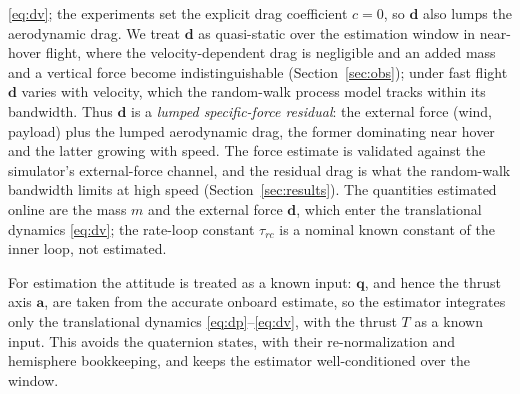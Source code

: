 \documentclass[lettersize,journal]{IEEEtran}
\newcommand{\vect}[1]{\bm{#1}}
\begin{document}
\eqref{eq:dv}; the experiments set the explicit drag coefficient $c=0$, so $\vect{d}$
also lumps the aerodynamic drag. We treat $\vect{d}$ as quasi-static over the
estimation window in near-hover flight, where the velocity-dependent drag is
negligible and an added mass and a vertical force become indistinguishable
(Section~\ref{sec:obs}); under fast flight $\vect{d}$ varies with velocity, which
the random-walk process model tracks within its bandwidth. Thus $\vect{d}$ is a
\emph{lumped specific-force residual}: the external force (wind, payload) plus the
lumped aerodynamic drag, the former dominating near hover and the latter growing
with speed. The force estimate is validated against the simulator's external-force
channel, and the residual drag is what the random-walk bandwidth limits at high
speed (Section~\ref{sec:results}). The quantities
estimated online are the mass $m$ and the external force $\vect{d}$, which enter
the translational dynamics \eqref{eq:dv}; the rate-loop constant $\tau_{rc}$ is a
nominal known constant of the inner loop, not estimated.

For estimation the attitude is treated as a known input: $\vect{q}$, and hence
the thrust axis $\vect{a}$, are taken from the accurate onboard estimate, so the
estimator integrates only the translational dynamics
\eqref{eq:dp}--\eqref{eq:dv}, with the thrust $T$ as a known input. This avoids the
quaternion states, with their re-normalization and hemisphere bookkeeping, and
keeps the estimator well-conditioned over the window.
\end{document}
